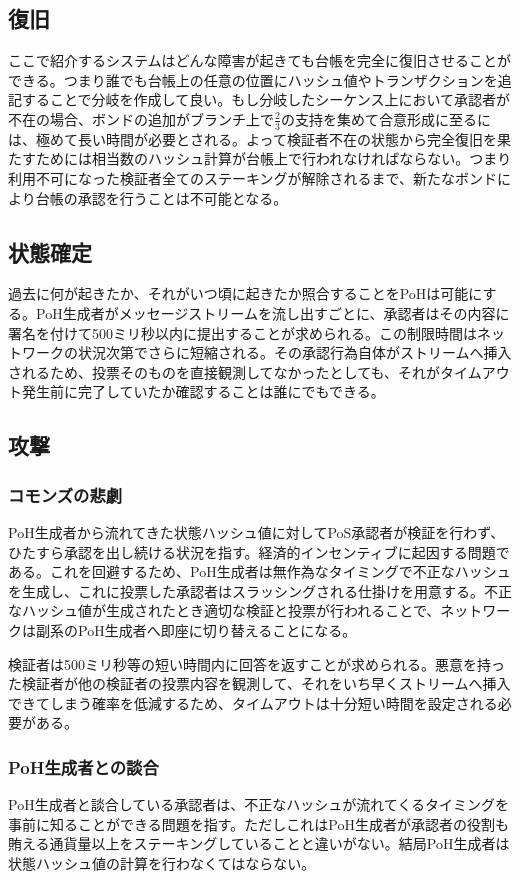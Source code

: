 \documentclass[12pt]{ltjsarticle}
\begin{document}
\subsection{復旧}
ここで紹介するシステムはどんな障害が起きても台帳を完全に復旧させることができる。つまり誰でも台帳上の任意の位置にハッシュ値やトランザクションを追記することで分岐を作成して良い。もし分岐したシーケンス上において承認者が不在の場合、ボンドの追加がブランチ上で\(\frac{2}{3}\)の支持を集めて合意形成に至るには、極めて長い時間が必要とされる。よって検証者不在の状態から完全復旧を果たすためには相当数のハッシュ計算が台帳上で行われなければならない。つまり利用不可になった検証者全てのステーキングが解除されるまで、新たなボンドにより台帳の承認を行うことは不可能となる。

\subsection{状態確定}
過去に何が起きたか、それがいつ頃に起きたか照合することをPoHは可能にする。PoH生成者がメッセージストリームを流し出すごとに、承認者はその内容に署名を付けて500ミリ秒以内に提出することが求められる。この制限時間はネットワークの状況次第でさらに短縮される。その承認行為自体がストリームへ挿入されるため、投票そのものを直接観測してなかったとしても、それがタイムアウト発生前に完了していたか確認することは誰にでもできる。

\subsection{攻撃}
\subsubsection{コモンズの悲劇}
PoH生成者から流れてきた状態ハッシュ値に対してPoS承認者が検証を行わず、ひたすら承認を出し続ける状況を指す。経済的インセンティブに起因する問題である。これを回避するため、PoH生成者は無作為なタイミングで不正なハッシュを生成し、これに投票した承認者はスラッシングされる仕掛けを用意する。不正なハッシュ値が生成されたとき適切な検証と投票が行われることで、ネットワークは副系のPoH生成者へ即座に切り替えることになる。

検証者は500ミリ秒等の短い時間内に回答を返すことが求められる。悪意を持った検証者が他の検証者の投票内容を観測して、それをいち早くストリームへ挿入できてしまう確率を低減するため、タイムアウトは十分短い時間を設定される必要がある。

\subsubsection{PoH生成者との談合}\label{subsubsec:collusion}
PoH生成者と談合している承認者は、不正なハッシュが流れてくるタイミングを事前に知ることができる問題を指す。ただしこれはPoH生成者が承認者の役割も賄える通貨量以上をステーキングしていることと違いがない。結局PoH生成者は状態ハッシュ値の計算を行わなくてはならない。
\end{document}
